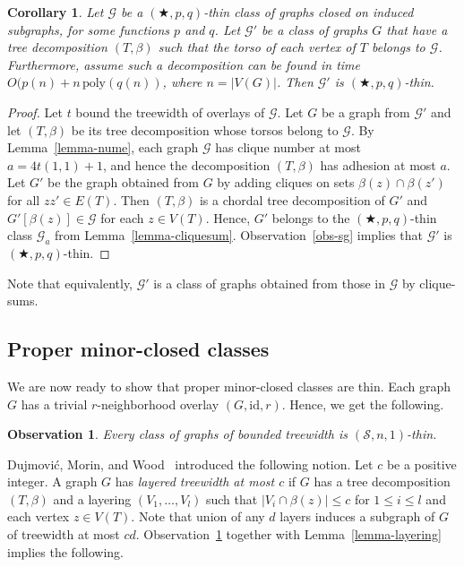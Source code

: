 \documentclass[a4paper,11pt]{article}
\newcommand{\GG}{{\mathcal G}}
\newcommand{\Ss}{{\mathcal S}}
\newcommand{\poly}{\text{poly}}
\newtheorem{corollary}[theorem]{Corollary}
\newtheorem{observation}[theorem]{Observation}
\begin{document}
\begin{corollary}\label{cor-cliquesum}
Let $\GG$ be a $(\bigstar,p,q)$-thin class of graphs closed on induced subgraphs, for some functions $p$ and $q$.
Let $\GG'$ be a class of graphs $G$ that have a tree decomposition $(T,\beta)$ such that the torso of each vertex of $T$
belongs to $\GG$.  Furthermore, assume such a decomposition can be found in time $O(p(n)+n\,\poly(q(n))$, where $n=|V(G)|$.
Then $\GG'$ is $(\bigstar,p,q)$-thin.
\end{corollary}
\begin{proof}
Let $t$ bound the treewidth of overlays of $\GG$.  Let $G$ be a graph from $\GG'$ and let $(T,\beta)$ be its tree decomposition
whose torsos belong to $\GG$.
By Lemma~\ref{lemma-nume}, each graph $\GG$ has clique number at most $a=4t(1,1)+1$, and hence the decomposition $(T,\beta)$
has adhesion at most $a$.  Let $G'$ be the graph obtained from $G$ by adding cliques on sets $\beta(z)\cap \beta(z')$ for all $zz'\in E(T)$.
Then $(T,\beta)$ is a chordal tree decomposition of $G'$ and $G'[\beta(z)]\in\GG$ for each $z\in V(T)$.
Hence, $G'$ belongs to the $(\bigstar,p,q)$-thin class $\GG_a$ from Lemma~\ref{lemma-cliquesum}.  Observation~\ref{obs-sg} implies that
$\GG'$ is $(\bigstar,p,q)$-thin.
\end{proof}
Note that equivalently, $\GG'$ is a class of graphs obtained from those in $\GG$ by clique-sums.

\subsection{Proper minor-closed classes}

We are now ready to show that proper minor-closed classes are thin.
Each graph $G$ has a trivial $r$-neighborhood overlay $(G,\text{id},r)$.  Hence, we get the following.

\begin{observation}\label{obs-tw-thin}
Every class of graphs of bounded treewidth is $(\Ss,n,1)$-thin.
\end{observation}

Dujmovi\'{c}, Morin, and Wood~\cite{layers} introduced the following notion.
Let $c$ be a positive integer.  A graph $G$ has \emph{layered treewidth at most $c$} if $G$ has a tree decomposition $(T,\beta)$
and a layering $(V_1,\ldots, V_l)$ such that $|V_i\cap\beta(z)|\le c$ for $1\le i\le l$ and each vertex $z\in V(T)$.
Note that union of any $d$ layers induces a subgraph of $G$ of treewidth at most $cd$.  Observation~\ref{obs-tw-thin}
together with Lemma~\ref{lemma-layering} implies the following.
\end{document}
